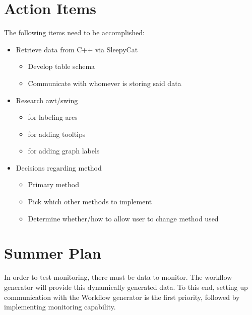 \documentclass[a4paper,12pt]{article}
\begin{document}
\section*{Action Items}

The following items need to be accomplished:

\begin{itemize}
\item Retrieve data from C++ via SleepyCat
\begin{itemize}
\item Develop table schema
\item Communicate with whomever is storing said data
\end{itemize}
\item Research awt/swing
\begin{itemize}
\item for labeling arcs
\item for adding tooltips
\item for adding graph labels
\end{itemize}
\item Decisions regarding method
\begin{itemize}
\item Primary method
\item Pick which other methods to implement
\item Determine whether/how to allow user to change method used
\end{itemize}
\end{itemize}

\section*{Summer Plan}

In order to test monitoring, there must be data to monitor. The workflow
generator will provide this dynamically generated data. To this end, setting up
communication with the Workflow generator is the first priority, followed by
implementing monitoring capability.
\end{document}
